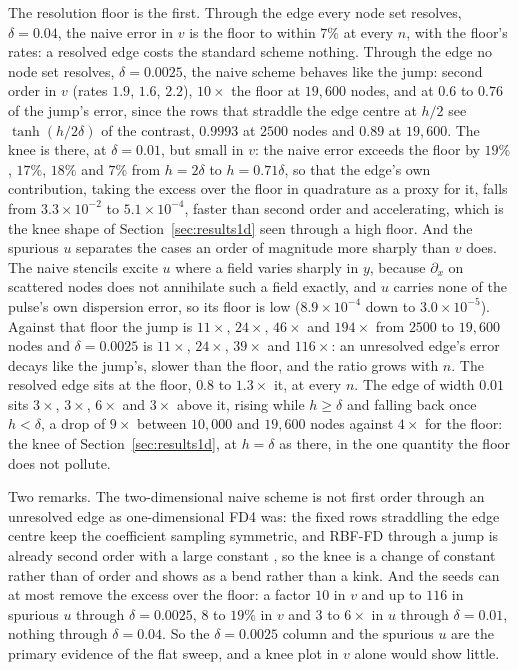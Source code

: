 \documentclass[11pt]{amsart}
\theoremstyle{definition}
\theoremstyle{remark}
\begin{document}
The resolution floor is the first. Through the edge every node set
resolves, $\delta = 0.04$, the naive error in $v$ is the floor to within
$7\%$ at every $n$, with the floor's rates: a resolved edge costs the
standard scheme nothing. Through the edge no node set resolves,
$\delta = 0.0025$, the naive scheme behaves like the jump: second order
in $v$ (rates $1.9$, $1.6$, $2.2$), $10\times$ the floor at $19{,}600$
nodes, and at $0.6$ to $0.76$ of the jump's error, since the rows that
straddle the edge centre at $h / 2$ see $\tanh(h / 2\delta)$ of the
contrast, $0.9993$ at $2500$ nodes and $0.89$ at $19{,}600$. The knee is
there, at $\delta = 0.01$, but small in $v$: the naive error exceeds the
floor by $19\%$, $17\%$, $18\%$ and $7\%$ from $h = 2\delta$ to
$h = 0.71\delta$, so that the edge's own contribution, taking the excess over
the floor in quadrature as a proxy for it, falls from $3.3 \times 10^{-2}$ to $5.1 \times 10^{-4}$,
faster than second order and accelerating, which is the knee shape of
Section~\ref{sec:results1d} seen through a high floor. And the spurious
$u$ separates the cases an order of magnitude more sharply than $v$
does. The naive stencils excite $u$ where a field varies sharply in $y$,
because $\partial_x$ on scattered nodes does not annihilate such a field
exactly, and $u$ carries none of the pulse's own dispersion error, so
its floor is low ($8.9 \times 10^{-4}$ down to $3.0 \times 10^{-5}$).
Against that floor the jump is $11\times$, $24\times$, $46\times$ and
$194\times$ from $2500$ to $19{,}600$ nodes and $\delta = 0.0025$ is
$11\times$, $24\times$, $39\times$ and $116\times$: an unresolved edge's
error decays like the jump's, slower than the floor, and the ratio grows
with $n$. The resolved edge sits at the floor, $0.8$ to $1.3\times$ it,
at every $n$. The edge of
width $0.01$ sits $3\times$, $3\times$, $6\times$ and $3\times$ above it,
rising while $h \ge \delta$ and falling back once $h < \delta$, a drop of
$9\times$ between $10{,}000$ and $19{,}600$ nodes against $4\times$ for
the floor: the knee of Section~\ref{sec:results1d}, at $h = \delta$ as
there, in the one quantity the floor does not pollute.

Two remarks. The two-dimensional naive scheme is not first order through
an unresolved edge as one-dimensional FD4 was: the fixed rows straddling
the edge centre keep the coefficient sampling symmetric, and RBF-FD
through a jump is already second order with a large constant
\cite{MartinFornberg2017}, so the knee is a change of constant rather
than of order and shows as a bend rather than a kink. And the seeds can
at most remove the excess over the floor: a factor $10$ in $v$ and up to
$116$ in spurious $u$ through $\delta = 0.0025$, $8$ to $19\%$ in $v$
and $3$ to $6\times$ in $u$ through $\delta = 0.01$, nothing through
$\delta = 0.04$. So the $\delta = 0.0025$ column and the spurious $u$
are the primary evidence of the flat sweep, and a knee plot in $v$ alone
would show little.
\end{document}
